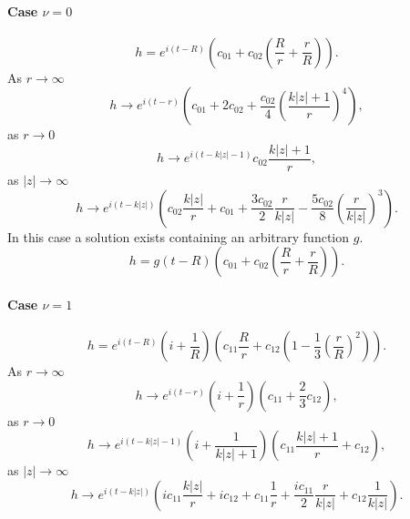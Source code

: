 \documentclass[letterpaper,12pt]{article}
\begin{document}
\paragraph{Case $\nu=0$}
\begin {equation}
\label{h(t,0)}
 h=e^{i(t-R)}\left(c_{01}+c_{02}\left(\frac{R}{r}+\frac{r}{R}\right)\right).
\end{equation}
As $r\to \infty$
\begin {equation}
\label{}
 h\to e^{i(t-r)}\left(c_{01}+
 2c_{02}+\frac{c_{02}}{4}\left(\frac{k|z|+1}{r}\right)^4\right),
\end{equation}
as $r\to 0$
\begin {equation}
\label{}
 h\to e^{i(t-k|z|-1)}c_{02}\frac{k|z|+1}{r},
\end{equation}
as $|z|\to \infty$
\begin {equation}
\label{}
 h\to e^{i(t-k|z|)}\left(c_{02}\frac{k|z|}{r} + c_{01} +
 \frac{3c_{02}}{2}\frac{r}{k|z|}-
 \frac{5c_{02}}{8}\left(\frac{r}{k|z|}\right)^3\right).
\end{equation}
In this case a solution exists containing an arbitrary function
$g$.
\begin {equation}
\label{}
 h=g(t-R)\left(c_{01}+c_{02}\left(\frac{R}{r}+\frac{r}{R}\right)\right).
\end{equation}

\paragraph{Case $\nu=1$}
\begin {equation}
\label{} h=e^{i(t-R)}\left(i+\frac{1}{R}\right)
\left(c_{11}\frac{R}{r}+
c_{12}\left(1-\frac{1}{3}\left(\frac{r}{R}\right)^2\right)\right).
\end{equation}
As $r\to \infty$
\begin {equation}
\label{}
 h\to e^{i(t-r)}\left(i+\frac{1}{r}\right)\left(c_{11}+\frac{2}{3}c_{12}\right),
\end{equation}
as $r\to 0$
\begin {equation}
\label{}
 h\to e^{i(t-k|z|-1)}\left(i+\frac{1}{k|z|+1}\right)\left(c_{11}\frac{k|z|+1}{r}+c_{12}\right),
\end{equation}
as $|z|\to \infty$
\begin {equation}
\label{}
 h\to e^{i(t-k|z|)}\left(ic_{11}\frac{k|z|}{r} + ic_{12} + c_{11}\frac{1}{r}+
 \frac{ic_{11}}{2}\frac{r}{k|z|}+c_{12}\frac{1}{k|z|}\right).
\end{equation}
\end{document}
